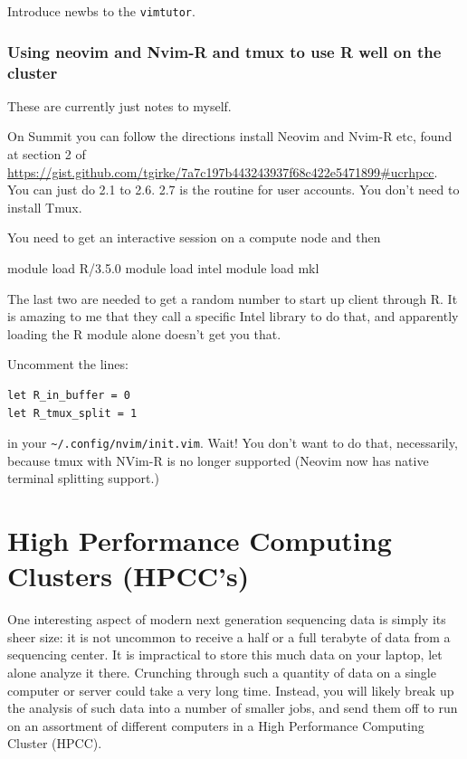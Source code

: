 \documentclass[]{krantz}
\makeatletter
\newenvironment{Shaded}{\begin{snugshade}}{\end{snugshade}}
\newcommand{\ExtensionTok}[1]{#1}
\newcommand{\NormalTok}[1]{#1}
\newenvironment{kframe}{%
\medskip{}
\setlength{\fboxsep}{.8em}
 \def\at@end@of@kframe{}%
 \ifinner\ifhmode%
  \def\at@end@of@kframe{\end{minipage}}%
  \begin{minipage}{\columnwidth}%
 \fi\fi%
 \def\FrameCommand##1{\hskip\@totalleftmargin \hskip-\fboxsep
 \colorbox{shadecolor}{##1}\hskip-\fboxsep
     \hskip-\linewidth \hskip-\@totalleftmargin \hskip\columnwidth}%
 \MakeFramed {\advance\hsize-\width
   \@totalleftmargin\z@ \linewidth\hsize
   \@setminipage}}%
 {\par\unskip\endMakeFramed%
 \at@end@of@kframe}
\renewenvironment{Shaded}{\begin{kframe}}{\end{kframe}}
\makeatother
\begin{document}
Introduce newbs to the \texttt{vimtutor}.

\hypertarget{using-neovim-and-nvim-r-and-tmux-to-use-r-well-on-the-cluster}{%
\subsection{Using neovim and Nvim-R and tmux to use R well on the cluster}\label{using-neovim-and-nvim-r-and-tmux-to-use-r-well-on-the-cluster}}

These are currently just notes to myself.

On Summit you can follow the directions install Neovim and Nvim-R etc, found
at section 2 of \url{https://gist.github.com/tgirke/7a7c197b443243937f68c422e5471899\#ucrhpcc}.
You can just do 2.1 to 2.6. 2.7 is the routine for user accounts. You don't need to install Tmux.

You need to get an interactive session on a compute node and then

\begin{Shaded}
\begin{Highlighting}[]
\ExtensionTok{module}\NormalTok{ load R/3.5.0}
\ExtensionTok{module}\NormalTok{ load intel}
\ExtensionTok{module}\NormalTok{ load mkl  }
\end{Highlighting}
\end{Shaded}

The last two are needed to get a random number to start up client through R.
It is amazing to me that they call a specific Intel library to do that, and apparently
loading the R module alone doesn't get you that.

Uncomment the lines:

\begin{verbatim}
let R_in_buffer = 0                                                       
let R_tmux_split = 1 
\end{verbatim}

in your \texttt{\textasciitilde{}/.config/nvim/init.vim}. Wait! You don't want to do that, necessarily, because tmux with NVim-R
is no longer supported (Neovim now has native terminal splitting support.)

\hypertarget{high-performance-computing-clusters-hpccs}{%
\chapter{High Performance Computing Clusters (HPCC's)}\label{high-performance-computing-clusters-hpccs}}

One interesting aspect of modern next generation sequencing data is simply its
sheer size: it is not uncommon to receive a half or a full terabyte of data from
a sequencing center. It is impractical to store this much data on your
laptop, let alone analyze it there. Crunching through such a quantity of data on a single
computer or server could take a very long time. Instead, you will likely break
up the analysis of such data into a number of smaller jobs, and send them off to
run on an assortment of different computers in a High Performance Computing Cluster (HPCC).
\end{document}
